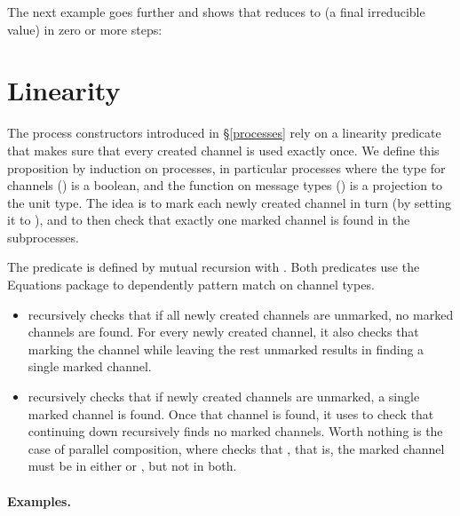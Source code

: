 \documentclass{mproj}
\begin{document}

The next example goes further and shows that  reduces to  (a final irreducible value) in zero or more steps:


\section{Linearity}\label{linearity}

The process constructors introduced in \S \ref{processes} rely on a linearity predicate that makes sure that every created channel is used exactly once. We define this proposition by induction on processes, in particular processes where the type for channels () is a boolean, and the function on message types () is a projection to the unit type. The idea is to mark each newly created channel in turn (by setting it to ), and to then check that exactly one marked channel is found in the subprocesses.


The predicate  is defined by mutual recursion with . Both predicates use the Equations package to dependently pattern match on channel types.
\begin{itemize}
    \item {} recursively checks that if all newly created channels are unmarked, no marked channels are found. For every newly created channel, it also checks that marking the channel while leaving the rest unmarked results in  finding a single marked channel.  

    \item {} recursively checks that if newly created channels are unmarked, a single marked channel is found. Once that channel is found, it uses  to check that continuing down recursively finds no marked channels. Worth nothing is the case of parallel composition, where  checks that , that is, the marked channel must be in either  or , but not in both.
\end{itemize}

\paragraph{Examples.}
\end{document}
